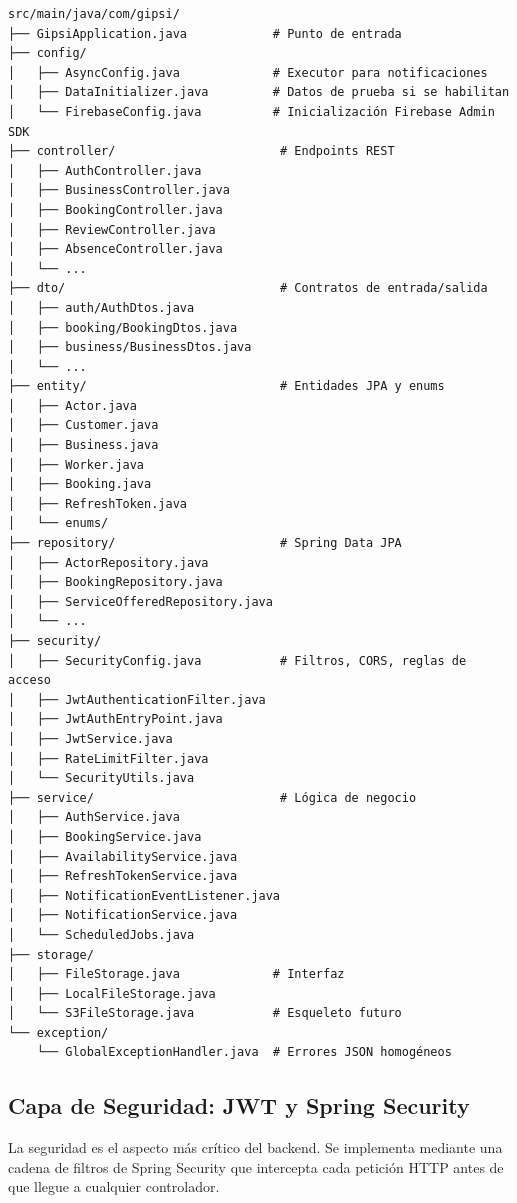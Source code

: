 \documentclass[12pt,a4paper,twoside]{report}
\begin{document}
\begin{lstlisting}[style=yamlStyle, caption={Estructura de paquetes del backend}, label={lst:backend-estructura}]
src/main/java/com/gipsi/
├── GipsiApplication.java            # Punto de entrada
├── config/
│   ├── AsyncConfig.java             # Executor para notificaciones
│   ├── DataInitializer.java         # Datos de prueba si se habilitan
│   └── FirebaseConfig.java          # Inicialización Firebase Admin SDK
├── controller/                       # Endpoints REST
│   ├── AuthController.java
│   ├── BusinessController.java
│   ├── BookingController.java
│   ├── ReviewController.java
│   ├── AbsenceController.java
│   └── ...
├── dto/                              # Contratos de entrada/salida
│   ├── auth/AuthDtos.java
│   ├── booking/BookingDtos.java
│   ├── business/BusinessDtos.java
│   └── ...
├── entity/                           # Entidades JPA y enums
│   ├── Actor.java
│   ├── Customer.java
│   ├── Business.java
│   ├── Worker.java
│   ├── Booking.java
│   ├── RefreshToken.java
│   └── enums/
├── repository/                       # Spring Data JPA
│   ├── ActorRepository.java
│   ├── BookingRepository.java
│   ├── ServiceOfferedRepository.java
│   └── ...
├── security/
│   ├── SecurityConfig.java           # Filtros, CORS, reglas de acceso
│   ├── JwtAuthenticationFilter.java
│   ├── JwtAuthEntryPoint.java
│   ├── JwtService.java
│   ├── RateLimitFilter.java
│   └── SecurityUtils.java
├── service/                          # Lógica de negocio
│   ├── AuthService.java
│   ├── BookingService.java
│   ├── AvailabilityService.java
│   ├── RefreshTokenService.java
│   ├── NotificationEventListener.java
│   ├── NotificationService.java
│   └── ScheduledJobs.java
├── storage/
│   ├── FileStorage.java             # Interfaz
│   ├── LocalFileStorage.java
│   └── S3FileStorage.java           # Esqueleto futuro
└── exception/
    └── GlobalExceptionHandler.java  # Errores JSON homogéneos
\end{lstlisting}

\subsection{Capa de Seguridad: JWT y Spring Security}

La seguridad es el aspecto más crítico del backend. Se implementa mediante una cadena de filtros de Spring Security que intercepta cada petición HTTP antes de que llegue a cualquier controlador.
\end{document}
